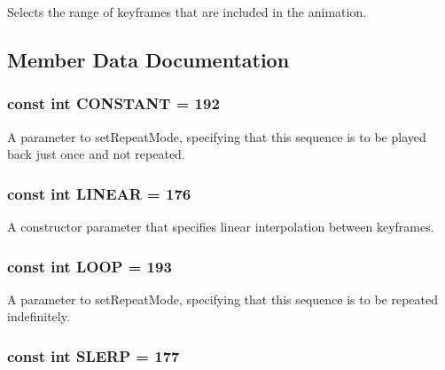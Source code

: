 Selects the range of keyframes that are included in the animation. 

\subsection{Member Data Documentation}
\hypertarget{classm3g_1_1KeyframeSequence_b45ff833865ae8962be27923995f91a3}{
\subsubsection[{CONSTANT}]{\setlength{\rightskip}{0pt plus 5cm}const int {\bf CONSTANT} = 192}}
\label{classm3g_1_1KeyframeSequence_b45ff833865ae8962be27923995f91a3}


A parameter to setRepeatMode, specifying that this sequence is to be played back just once and not repeated. \hypertarget{classm3g_1_1KeyframeSequence_23ccf193c67257f1be26417041cecb31}{
\subsubsection[{LINEAR}]{\setlength{\rightskip}{0pt plus 5cm}const int {\bf LINEAR} = 176}}
\label{classm3g_1_1KeyframeSequence_23ccf193c67257f1be26417041cecb31}


A constructor parameter that specifies linear interpolation between keyframes. \hypertarget{classm3g_1_1KeyframeSequence_ecc439231d4f3639e6f6a9625615a0f7}{
\subsubsection[{LOOP}]{\setlength{\rightskip}{0pt plus 5cm}const int {\bf LOOP} = 193}}
\label{classm3g_1_1KeyframeSequence_ecc439231d4f3639e6f6a9625615a0f7}


A parameter to setRepeatMode, specifying that this sequence is to be repeated indefinitely. \hypertarget{classm3g_1_1KeyframeSequence_77ebb943765f530d2883e1c26127d3ce}{
\subsubsection[{SLERP}]{\setlength{\rightskip}{0pt plus 5cm}const int {\bf SLERP} = 177}}
\label{classm3g_1_1KeyframeSequence_77ebb943765f530d2883e1c26127d3ce}


